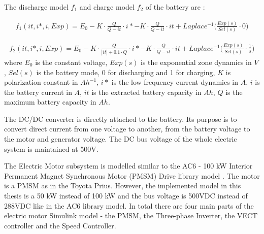 The discharge model $f_1$ and charge model $f_2$ of the battery are \citep{batteryMatlab}:

\begin{equation}
\begin{split}
f_1(it,i*,i,Exp) = E_0 - K \cdot \frac{Q}{Q-it} \cdot i* - K \cdot \frac{Q}{Q-it} \cdot it + Laplace^{-1} \bigg( \frac{Exp(s)}{Sel(s)} \cdot 0 \bigg)
\end{split}
\end{equation}

\begin{equation}
\begin{split}
f_2(it,i*,i,Exp) = E_0 - K \cdot \frac{Q}{|it|+0.1 \cdot Q} \cdot i* - K \cdot \frac{Q}{Q-it} \cdot it + Laplace^{-1} \bigg( \frac{Exp(s)}{Sel(s)} \cdot \frac{1}{s} \bigg)
\end{split}
\end{equation}
where $E_0$ is the constant voltage, $Exp(s)$ is the exponential zone dynamics in $V$, $Sel(s)$ is the battery mode, 0 for discharging and 1 for charging, $K$ is polarization constant in $Ah^{-1}$, $i*$ is the low frequency current dynamics in $A$, $i$ is the battery current in $A$, $it$ is the extracted battery capacity in $Ah$, $Q$ is the maximum battery capacity in $Ah$.

The DC/DC converter is directly attached to the battery. Its purpose is to convert direct current from one voltage to another, from the battery voltage to the motor and generator voltage. The DC bus voltage of the whole electric system is maintained at 500V. 

The Electric Motor subsystem is modelled similar to the AC6 - 100 kW Interior Permanent Magnet Synchronous Motor (PMSM) Drive library model \citep{ac6Matlab}. The motor is a PMSM as in the Toyota Prius. However, the implemented model in this thesis is a 50 kW instead of 100 kW and the bus voltage is 500VDC instead of 288VDC like in the AC6 library model. In total there are four main parts of the electric motor Simulink model - the PMSM, the Three-phase Inverter, the VECT controller and the Speed Controller. 

